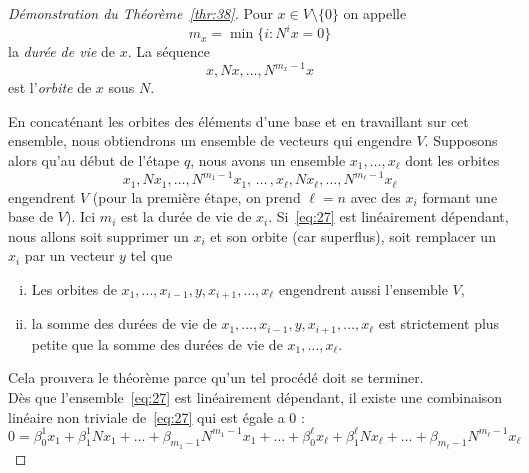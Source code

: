 \begin{proof}[Démonstration du Théorème~\ref{thr:38}] 
  Pour $x \in V \setminus \{0\}$ on appelle 
  \begin{displaymath}
    m_x = \min \{ i \colon N^ix = 0\}
  \end{displaymath}
  la \emph{durée de vie} de $x$. 
  La séquence 
  \begin{displaymath}
    x, Nx, \dots, N^{m_x-1} x
  \end{displaymath}
  est l'\emph{orbite} de $x$ sous $N$. 
  
  En concaténant les orbites des éléments d'une base et en travaillant sur cet ensemble, nous obtiendrons un ensemble de vecteurs qui engendre $V$. 
  Supposons alors qu'au début de l'étape $q$, nous avons un ensemble $x_1,\dots,x_\ell$ dont les orbites 
  \begin{equation}
    \label{eq:27}
    x_1,Nx_1,\dots,N^{m_1-1}x_1, \,\dots \, ,  x_\ell,Nx_\ell,\dots,N^{m_\ell-1}x_\ell
  \end{equation}
  engendrent $V$ (pour la première étape, on prend $\ell = n$ avec des $x_i$ formant une base de $V$). Ici $m_i$ est la durée de vie de $x_i$. Si~\eqref{eq:27} est linéairement dépendant, nous allons soit supprimer un $x_i$ et son orbite (car superflus), soit remplacer un $x_i$ par un vecteur $y$ tel que 
  \begin{enumerate}[i)]
  \item Les orbites de $x_1,\dots, x_{i-1},y,x_{i+1},\dots,x_{\ell}$ engendrent aussi l'ensemble  $V$, 
  \item la somme des durées de vie de $x_1,\dots, x_{i-1},y,x_{i+1},\dots,x_{\ell}$  est strictement plus petite que la somme des durées de vie de $x_1,\dots,x_{\ell}$. 
  \end{enumerate}
Cela prouvera le théorème parce qu'un tel procédé doit se terminer. \\

Dès que l'ensemble~\eqref{eq:27} est linéairement dépendant, il existe une combinaison linéaire non triviale de~\eqref{eq:27} qui est égale a $0$ :
\begin{displaymath}
0 =   β_0^1 x_1 + β_1^1 Nx_1+ \dots+ β_{m_1-1}N^{m_1-1}x_1 + \dots + 
β_0^\ell x_\ell + β_1^\ell Nx_\ell+ \dots+ β_{m_\ell-1}N^{m_\ell-1}x_\ell 
\end{displaymath}


\end{proof}
